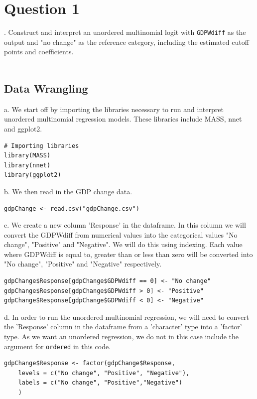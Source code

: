 \documentclass[12pt,letterpaper]{article}
\begin{document}
\pagebreak

\section*{Question 1} 
\vspace{.25cm}

. Construct and interpret an unordered multinomial logit with \texttt{GDPWdiff} as the output and "no change" as the reference category, including the estimated cutoff points and coefficients.
\\\\

\subsection{Data Wrangling}

\noindent a. We start off by importing the libraries necessary to run and interpret unordered multinomial regression models. These libraries include MASS, nnet and ggplot2.
\\
\begin{lstlisting}
# Importing libraries
library(MASS)
library(nnet)
library(ggplot2)
\end{lstlisting}


\noindent b. We then read in the GDP change data.
\\
\begin{lstlisting}
gdpChange <- read.csv("gdpChange.csv")
\end{lstlisting}

\noindent c. We create a new column 'Response' in the dataframe. In this column we will convert the GDPWdiff from numerical values into the categorical values "No change", "Positive" and "Negative". We will do this using indexing. Each value where GDPWdiff is equal to, greater than or less than zero will be converted into "No change", "Positive" and "Negative" respectively.
\\

\begin{lstlisting}
gdpChange$Response[gdpChange$GDPWdiff == 0] <- "No change" 
gdpChange$Response[gdpChange$GDPWdiff > 0] <- "Positive"
gdpChange$Response[gdpChange$GDPWdiff < 0] <- "Negative"
\end{lstlisting}

\noindent d. In order to run the unordered multinomial regression, we will need to convert the 'Response' column in the dataframe from a 'character' type into a 'factor' type. As we want an unordered regression, we do not in this case include the argument for \texttt{ordered} in this code. 
\\
\begin{lstlisting}
gdpChange$Response <- factor(gdpChange$Response,
	levels = c("No change", "Positive", "Negative"),
	labels = c("No change", "Positive","Negative")
	)
\end{lstlisting}
\end{document}
